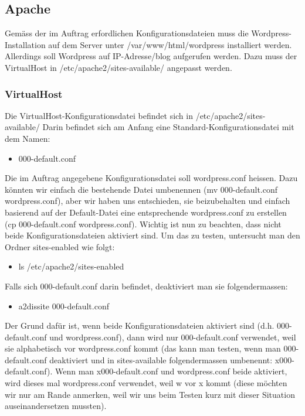 \documentclass{article}
\begin{document}
	\subsection{Apache}
	Gemäss der im Auftrag erfordlichen Konfigurationsdateien muss die Wordpress-Installation auf dem Server unter /var/www/html/wordpress installiert werden.
	Allerdings soll Wordpress auf IP-Adresse/blog aufgerufen werden. Dazu muss der VirtualHost in /etc/apache2/sites-available/ angepasst werden.
	\subsubsection{VirtualHost}
	Die VirtualHost-Konfigurationsdatei befindet sich in /etc/apache2/sites-available/
	Darin befindet sich am Anfang eine Standard-Konfigurationsdatei mit dem Namen:
	\begin{itemize}
		\item 000-default.conf
	\end{itemize}		
	Die im Auftrag angegebene Konfigurationsdatei soll wordpress.conf heissen. Dazu könnten wir einfach die bestehende Datei umbenennen (mv 000-default.conf wordpress.conf), aber wir haben uns entschieden, sie beizubehalten und einfach basierend auf der Default-Datei eine entsprechende wordpress.conf zu erstellen (cp 000-default.conf wordpress.conf). Wichtig ist nun zu beachten, dass nicht beide Konfigurationsdateien aktiviert sind. Um das zu testen, untersucht man den Ordner sites-enabled wie folgt:
	\begin{itemize}
		\item ls /etc/apache2/sites-enabled
	\end{itemize}
	Falls sich  000-default.conf darin befindet, deaktiviert man sie folgendermassen:
	\begin{itemize}
		\item a2dissite  000-default.conf
	\end{itemize}
	Der Grund dafür ist, wenn beide Konfigurationsdateien aktiviert sind (d.h. 000-default.conf und wordpress.conf), dann wird nur 000-default.conf verwendet, weil sie alphabetisch vor wordpress.conf kommt (das kann man testen, wenn man 000-default.conf deaktiviert und in sites-available folgendermassen umbenennt: x000-default.conf). Wenn man x000-default.conf und wordpress.conf beide aktiviert, wird dieses mal wordpress.conf verwendet, weil w vor x kommt (diese möchten wir nur am Rande anmerken, weil wir uns beim Testen kurz mit dieser Situation auseinandersetzen mussten).
	\newline
\end{document}
